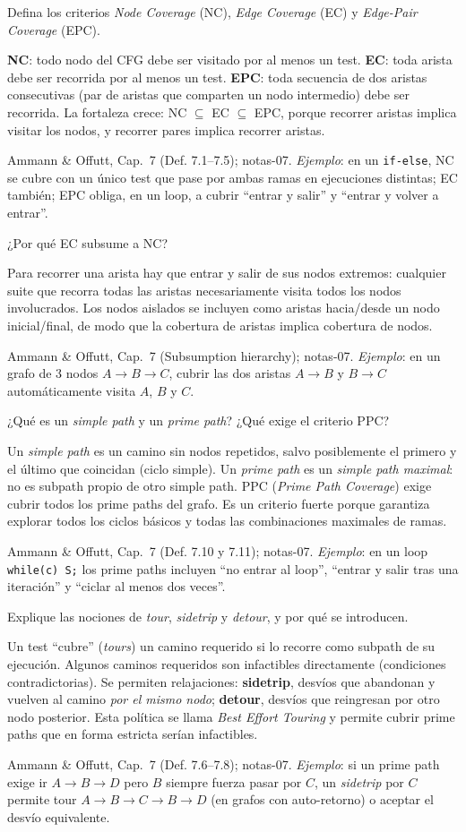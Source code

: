 \documentclass[11pt,a4paper]{article}
\newcounter{preg}
\newcommand{\qa}[3]{%
  \stepcounter{preg}%
  \vspace{0.4em}
  \begin{preguntabox}{\thepreg}
  #1
  \end{preguntabox}
  \begin{respuestabox}
  #2
  \end{respuestabox}
  \begin{refbox}
  #3
  \end{refbox}
  \vspace{0.6em}
}
\begin{document}
\qa{Defina los criterios \emph{Node Coverage} (NC), \emph{Edge Coverage} (EC) y \emph{Edge-Pair Coverage} (EPC).}
{\textbf{NC}: todo nodo del CFG debe ser visitado por al menos un test. \textbf{EC}: toda arista debe ser recorrida por al menos un test. \textbf{EPC}: toda secuencia de dos aristas consecutivas (par de aristas que comparten un nodo intermedio) debe ser recorrida. La fortaleza crece: NC $\subseteq$ EC $\subseteq$ EPC, porque recorrer aristas implica visitar los nodos, y recorrer pares implica recorrer aristas.}
{Ammann \& Offutt, Cap.~7 (Def. 7.1--7.5); notas-07. \emph{Ejemplo}: en un \texttt{if-else}, NC se cubre con un único test que pase por ambas ramas en ejecuciones distintas; EC también; EPC obliga, en un loop, a cubrir ``entrar y salir'' y ``entrar y volver a entrar''.}

\qa{¿Por qué EC subsume a NC?}
{Para recorrer una arista hay que entrar y salir de sus nodos extremos: cualquier suite que recorra todas las aristas necesariamente visita todos los nodos involucrados. Los nodos aislados se incluyen como aristas hacia/desde un nodo inicial/final, de modo que la cobertura de aristas implica cobertura de nodos.}
{Ammann \& Offutt, Cap.~7 (Subsumption hierarchy); notas-07. \emph{Ejemplo}: en un grafo de 3 nodos $A\to B \to C$, cubrir las dos aristas $A\to B$ y $B\to C$ automáticamente visita $A$, $B$ y $C$.}

\qa{¿Qué es un \emph{simple path} y un \emph{prime path}? ¿Qué exige el criterio PPC?}
{Un \emph{simple path} es un camino sin nodos repetidos, salvo posiblemente el primero y el último que coincidan (ciclo simple). Un \emph{prime path} es un \emph{simple path maximal}: no es subpath propio de otro simple path. PPC (\emph{Prime Path Coverage}) exige cubrir todos los prime paths del grafo. Es un criterio fuerte porque garantiza explorar todos los ciclos básicos y todas las combinaciones maximales de ramas.}
{Ammann \& Offutt, Cap.~7 (Def. 7.10 y 7.11); notas-07. \emph{Ejemplo}: en un loop \texttt{while(c) S;} los prime paths incluyen ``no entrar al loop'', ``entrar y salir tras una iteración'' y ``ciclar al menos dos veces''.}

\qa{Explique las nociones de \emph{tour}, \emph{sidetrip} y \emph{detour}, y por qué se introducen.}
{Un test ``cubre'' (\emph{tours}) un camino requerido si lo recorre como subpath de su ejecución. Algunos caminos requeridos son infactibles directamente (condiciones contradictorias). Se permiten relajaciones: \textbf{sidetrip}, desvíos que abandonan y vuelven al camino \emph{por el mismo nodo}; \textbf{detour}, desvíos que reingresan por otro nodo posterior. Esta política se llama \emph{Best Effort Touring} y permite cubrir prime paths que en forma estricta serían infactibles.}
{Ammann \& Offutt, Cap.~7 (Def. 7.6--7.8); notas-07. \emph{Ejemplo}: si un prime path exige ir $A\to B \to D$ pero $B$ siempre fuerza pasar por $C$, un \emph{sidetrip} por $C$ permite tour $A\to B\to C\to B\to D$ (en grafos con auto-retorno) o aceptar el desvío equivalente.}
\end{document}
